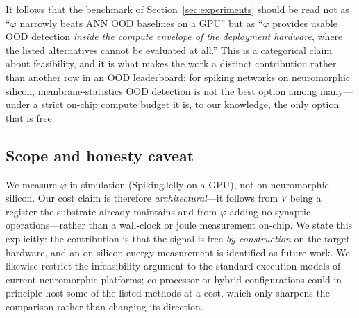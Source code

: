 It follows that the benchmark of Section~\ref{sec:experiments} should be read not as
``$\varphi$ narrowly beats ANN OOD baselines on a GPU'' but as ``$\varphi$ provides usable OOD
detection \emph{inside the compute envelope of the deployment hardware}, where the listed
alternatives cannot be evaluated at all.'' This is a categorical claim about feasibility, and
it is what makes the work a distinct contribution rather than another row in an OOD
leaderboard: for spiking networks on neuromorphic silicon, membrane-statistics OOD detection
is not the best option among many---under a strict on-chip compute budget it is, to our
knowledge, the only option that is free.

\subsection{Scope and honesty caveat}
\label{sec:hardware-caveat}

We measure $\varphi$ in simulation (SpikingJelly on a GPU), not on neuromorphic silicon. Our
cost claim is therefore \emph{architectural}---it follows from $V$ being a register the
substrate already maintains and from $\varphi$ adding no synaptic operations---rather than a
wall-clock or joule measurement on-chip. We state this explicitly: the contribution is that
the signal is free \emph{by construction} on the target hardware, and an on-silicon energy
measurement is identified as future work. We likewise restrict the infeasibility argument to
the standard execution models of current neuromorphic platforms; co-processor or hybrid
configurations could in principle host some of the listed methods at a cost, which only
sharpens the comparison rather than changing its direction.

